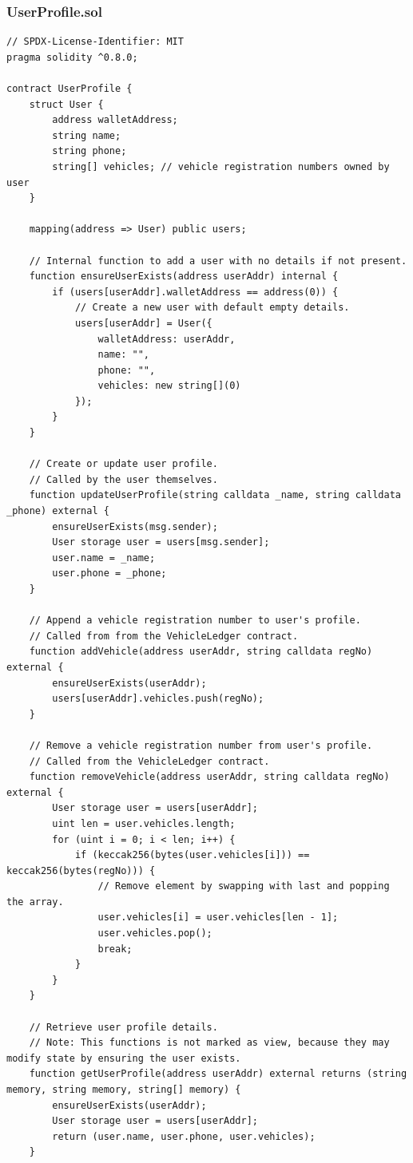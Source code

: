 \documentclass[12pt,a4paper]{article}
\begin{document}
    \subsubsection{UserProfile.sol}
    \begin{verbatim}
// SPDX-License-Identifier: MIT
pragma solidity ^0.8.0;

contract UserProfile {
    struct User {
        address walletAddress;
        string name;
        string phone;
        string[] vehicles; // vehicle registration numbers owned by user
    }

    mapping(address => User) public users;

    // Internal function to add a user with no details if not present.
    function ensureUserExists(address userAddr) internal {
        if (users[userAddr].walletAddress == address(0)) {
            // Create a new user with default empty details.
            users[userAddr] = User({
                walletAddress: userAddr,
                name: "",
                phone: "",
                vehicles: new string[](0)
            });
        }
    }

    // Create or update user profile.
    // Called by the user themselves.
    function updateUserProfile(string calldata _name, string calldata _phone) external {
        ensureUserExists(msg.sender);
        User storage user = users[msg.sender];
        user.name = _name;
        user.phone = _phone;
    }

    // Append a vehicle registration number to user's profile.
    // Called from from the VehicleLedger contract.
    function addVehicle(address userAddr, string calldata regNo) external {
        ensureUserExists(userAddr);
        users[userAddr].vehicles.push(regNo);
    }

    // Remove a vehicle registration number from user's profile.
    // Called from the VehicleLedger contract.
    function removeVehicle(address userAddr, string calldata regNo) external {
        User storage user = users[userAddr];
        uint len = user.vehicles.length;
        for (uint i = 0; i < len; i++) {
            if (keccak256(bytes(user.vehicles[i])) == keccak256(bytes(regNo))) {
                // Remove element by swapping with last and popping the array.
                user.vehicles[i] = user.vehicles[len - 1];
                user.vehicles.pop();
                break;
            }
        }
    }

    // Retrieve user profile details.
    // Note: This functions is not marked as view, because they may modify state by ensuring the user exists.
    function getUserProfile(address userAddr) external returns (string memory, string memory, string[] memory) {
        ensureUserExists(userAddr);
        User storage user = users[userAddr];
        return (user.name, user.phone, user.vehicles);
    }


\end{verbatim}
\end{document}
